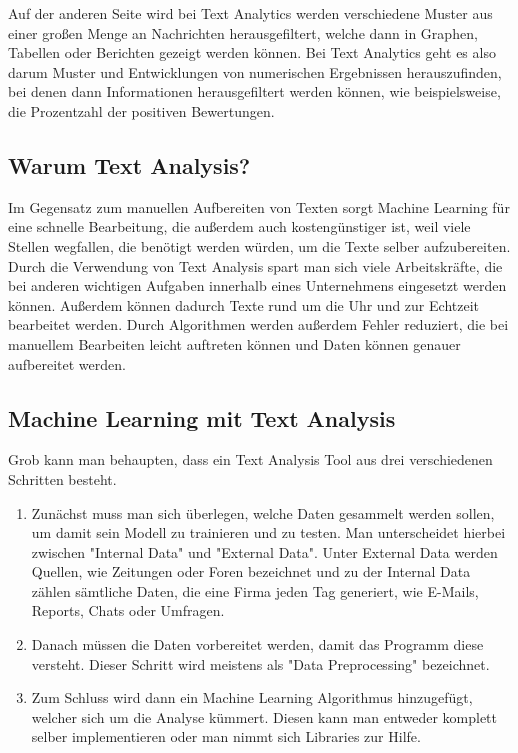 Auf der anderen Seite wird bei Text Analytics werden verschiedene Muster aus einer großen Menge an Nachrichten herausgefiltert, welche dann in Graphen, Tabellen oder Berichten gezeigt werden können.
Bei Text Analytics geht es also darum Muster und Entwicklungen von numerischen Ergebnissen herauszufinden, bei denen dann Informationen herausgefiltert werden können, wie beispielsweise, die Prozentzahl der positiven Bewertungen.\cite{textAnalysisMonkeylearn, machineLearningTextAnalysis}

\subsection{Warum Text Analysis?}

Im Gegensatz zum manuellen Aufbereiten von Texten sorgt Machine Learning für eine schnelle Bearbeitung, die außerdem auch kostengünstiger ist, weil viele Stellen wegfallen, die benötigt werden würden, um die Texte selber aufzubereiten.
Durch die Verwendung von Text Analysis spart man sich viele Arbeitskräfte, die bei anderen wichtigen Aufgaben innerhalb eines Unternehmens eingesetzt werden können.
Außerdem können dadurch Texte rund um die Uhr und zur Echtzeit bearbeitet werden.
Durch Algorithmen werden außerdem Fehler reduziert, die bei manuellem Bearbeiten leicht auftreten können und Daten können genauer aufbereitet werden.\cite{textAnalysisMonkeylearn}

\subsection{Machine Learning mit Text Analysis}

Grob kann man behaupten, dass ein Text Analysis Tool aus drei verschiedenen Schritten besteht.

\begin{enumerate}
    \item Zunächst muss man sich überlegen, welche Daten gesammelt werden sollen, um damit sein Modell zu trainieren und zu testen.
    Man unterscheidet hierbei zwischen "Internal Data" und "External Data".
    Unter External Data werden Quellen, wie Zeitungen oder Foren bezeichnet und zu der Internal Data zählen sämtliche Daten, die eine Firma jeden Tag generiert, wie E-Mails, Reports, Chats oder Umfragen.
    \item Danach müssen die Daten vorbereitet werden, damit das Programm diese versteht.
    Dieser Schritt wird meistens als "Data Preprocessing" bezeichnet.
    \item Zum Schluss wird dann ein Machine Learning Algorithmus hinzugefügt, welcher sich um die Analyse kümmert.
    Diesen kann man entweder komplett selber implementieren oder man nimmt sich Libraries zur Hilfe.\cite{machineLearningTextAnalysis}
\end{enumerate}

